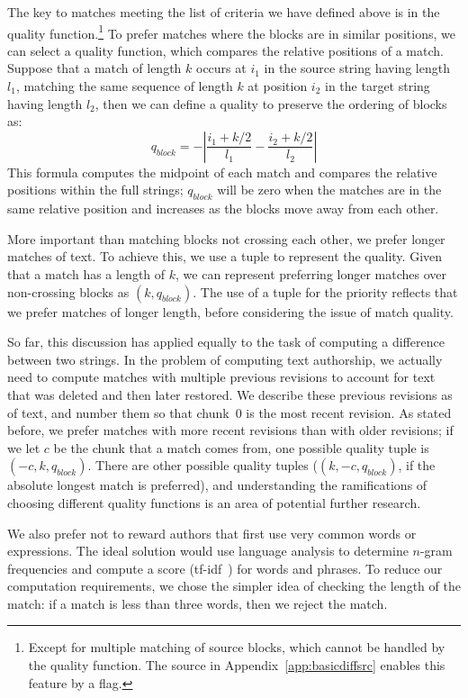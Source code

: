 The key to matches meeting the list of criteria we have
defined above is in the quality function.\footnote{Except for
multiple matching of source blocks, which cannot be handled
by the quality
function.  The source in Appendix~\ref{app:basicdiffsrc}
enables this feature by a flag.}
To prefer matches where the blocks are in similar positions,
we can select a quality function, which compares the relative
positions of a match.
Suppose that a match of length $k$ occurs at $i_1$ in the source
string having length $l_1$, matching the same sequence of length $k$ at
position $i_2$ in the target string having length $l_2$,
then we can define a quality to preserve the
ordering of blocks as:
\begin{equation}
q_{block} = -\left| \frac{i_1 + k/2}{l_1} - \frac{i_2 + k/2}{l_2} \right|
\end{equation}
This formula computes the midpoint of each match and compares
the relative positions within the full strings; $q_{block}$ will be
zero when the matches are in the same relative position
and increases as the blocks move away from each other.

More important than matching blocks not crossing each other,
we prefer longer matches of text.
To achieve this, we use a tuple to represent the quality.
Given that a match has a length of $k$, we can represent preferring
longer matches over non-crossing blocks as $(k, q_{block})$.
The use of a tuple for the priority reflects that we prefer
matches of longer length, before considering the issue
of match quality.  

So far, this discussion has applied equally to the task of
computing a difference between two strings.
In the problem of computing text authorship, we actually
need to compute matches with multiple previous revisions
to account for text that was deleted and then later restored.
We describe these previous revisions as  of text,
and number them so that chunk~0 is the most recent revision.
As stated before, we prefer matches with more recent revisions
than with older
revisions; if we let $c$ be the chunk that a match comes from,
one possible quality tuple is $(-c, k, q_{block})$.
There are other possible quality tuples (\eg $(k, -c, q_{block})$,
if the absolute longest match is preferred), and
understanding the ramifications of choosing different quality
functions is an area of potential further research.

We also prefer not to reward authors that first use very common words
or expressions.
The ideal solution would use language analysis to determine
$n$-gram frequencies and compute
a score (\eg tf-idf~\cite{Jones1972}) for words and phrases.
To reduce our computation requirements, we chose the simpler idea
of checking the length of the match: if a match is less than three
words, then we reject the match.

